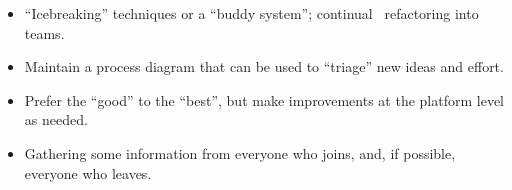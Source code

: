 \begin{itemize}
\itemsep1pt\parskip0pt
\item
  ``Icebreaking'' techniques or a ``buddy system''; continual~
  refactoring into teams.
\item
  Maintain a process diagram that can be used to ``triage'' new ideas
  and effort.
\item
  Prefer the ``good'' to the ``best'', but make improvements at the
  platform level as needed.
\item
  Gathering some information from everyone who joins, and, if possible,
  everyone who leaves.
\end{itemize}

